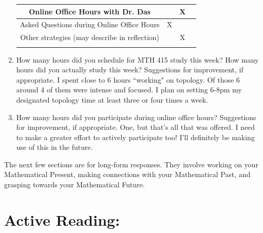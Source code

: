 \documentclass[10pt]{article}
\begin{document}
\begin{enumerate}
\begin{tabular}{|c|c|c|c|}
		Online Office Hours with Dr. Das &&X&\\
		\hline		
		Asked Questions during Online Office Hours &X&&\\
		\hline
		\hline
		
		Other strategies (may describe in reflection) &&X&\\
		&&&\\
		\hline
		
			
	\end{tabular}

\item How many hours did you schedule for MTH 415 study this week? How many hours did you actually study this week? Suggestions for improvement, if appropriate.
\vfill
I spent close to 6 hours ``working" on topology. Of those 6 around 4 of them were intense and focused. I plan on setting 6-8pm my designated topology time at least three or four times a week.
\item How many hours did you participate during online office hours? Suggestions for improvement, if appropriate.
\vfill
One, but that's all that was offered. I need to make a greater effort to actively participate too! I'll definitely be making use of this in the future.

\end{enumerate}

\newpage
The next few sections are for long-form responses. They involve working on your Mathematical Present, making connections with your Mathematical Past, and grasping towards your Mathematical Future.

\section*{Active Reading:}
\end{document}
